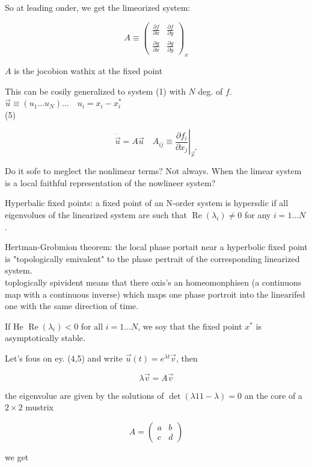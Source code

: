 \documentclass[10pt]{article}
\begin{document}
So at leading onder, we get the limeorized system:

\[
A \equiv\left(\begin{array}{ll}
\frac{\partial f}{\partial x} & \frac{\partial f}{\partial y}  \tag{4}\\
\frac{\partial g}{\partial x} & \frac{\partial g}{\partial y}
\end{array}\right)_{x}
\]

$A$ is the jocobion wathix at the fixed point

This can be cosily generalized to system (1) with $N$ deg. of $f$. $\vec{u} \equiv\left(u_{1} \ldots u_{N}\right) \ldots \quad u_{i}=x_{i}-x_{i}^{*}$\\
(5)

$$
\dot{\vec{u}}=\left.A \vec{u} \quad A_{i j} \equiv \frac{\partial f_{i}}{\partial x_{j}}\right|_{\vec{x}^{*}}
$$

Do it sofe to meglect the nonlimear terms? Not always. When the limear system is a local faithful representation of the nowlineer system?

Hyperbalic fixed points: a fixed point of an N-order system is hypersdic if all eigenvolues of the linearized system are such that $\operatorname{Re}\left(\lambda_{i}\right) \neq 0$ for any $i=1 \ldots N$.

Hertman-Grobmion theorem: the local phase portait near a hyperbolic fixed point is "topologically emivalent" to the phase pertrait of the corresponding linearized system.\\
toplogically spivident means that there oxis's an homeomonphisen (a continuons map with a continuous inverse) which maps one phase portroit into the linearifed one with the same direction of time.

If He $\operatorname{Re}\left(\lambda_{i}\right)<0$ for all $i=1 \ldots N$, we soy that the fixed point $x^{*}$ is asymptotically stable.

Let's fous on ey. (4,5) and write $\vec{u}(t)=e^{\lambda t} \vec{v}$, then

$$
\lambda \vec{v}=A \vec{v}
$$

the eigenvolue are given by the solutions of $\operatorname{det}(\lambda 11-\lambda)=0$ an the core of a $2 \times 2$ mustrix

$$
A=\left(\begin{array}{ll}
a & b \\
c & d
\end{array}\right)
$$

we get
\end{document}
